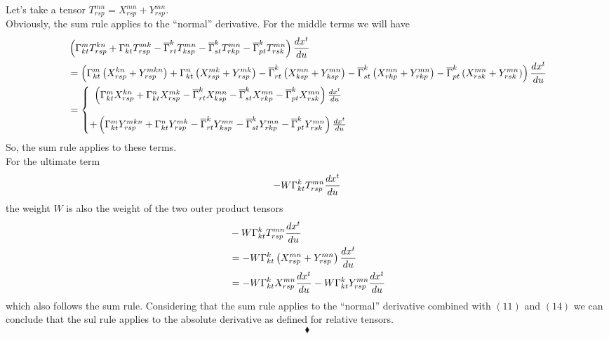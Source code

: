 Let's take a tensor $T^{mn}_{rsp} =X^{mn}_{rsp}+Y^{mn}_{rsp}$.\\
Obviously, the sum rule applies to the ``normal'' derivative.
For the middle terms we will have
\begin{align}
&\left(\Gamma^m_{kt}T^{kn}_{rsp}+\Gamma^n_{kt}T^{mk}_{rsp}-\overline{\Gamma}^k_{rt}T^{mn}_{ksp} -\overline{\Gamma}^k_{st}T^{mn}_{rkp} -\overline{\Gamma}^k_{pt}T^{mn}_{rsk} \right)\dv{x^t}{u}\\
&= \left(\Gamma^m_{kt}\left(X^{kn}_{rsp}+Y^{mkn}_{rsp}\right)+\Gamma^n_{kt}\left(X^{mk}_{rsp}+Y^{mk}_{rsp}\right)-\overline{\Gamma}^k_{rt}\left(X^{mn}_{ksp}+Y^{mn}_{ksp}\right) -\overline{\Gamma}^k_{st}\left(X^{mn}_{rkp}+Y^{mn}_{rkp}\right) -\overline{\Gamma}^k_{pt}\left(X^{mn}_{rsk}+Y^{mn}_{rsk}\right) \right)\dv{x^t}{u}\\
&= \left\{\begin{matrix}
\left(\Gamma^m_{kt}X^{kn}_{rsp}+\Gamma^n_{kt}X^{mk}_{rsp}-\overline{\Gamma}^k_{rt}X^{mn}_{ksp} -\overline{\Gamma}^k_{st}X^{mn}_{rkp} -\overline{\Gamma}^k_{pt}X^{mn}_{rsk} \right)\dv{x^t}{u}\\\\
+ \left(\Gamma^m_{kt}Y^{mkn}_{rsp}+\Gamma^n_{kt}Y^{mk}_{rsp}-\overline{\Gamma}^k_{rt}Y^{mn}_{ksp} -\overline{\Gamma}^k_{st}Y^{mn}_{rkp}-\overline{\Gamma}^k_{pt}Y^{mn}_{rsk}\right)\dv{x^t}{u}
\end{matrix}\right.
\end{align}
So, the sum rule applies to these terms.\\
For the ultimate term 
$$-W\Gamma^k_{kt}T^{mn}_{rsp}\dv{x^t}{u}$$ the weight $W$ is also the weight of the two  outer product tensors
\begin{align}
&-W\Gamma^k_{kt}T^{mn}_{rsp}\dv{x^t}{u}\\
&= 
-W\Gamma^k_{kt}\left(X^{mn}_{rsp}+Y^{mn}_{rsp}\right)\dv{x^t}{u}\\
&= 
-W\Gamma^k_{kt}X^{mn}_{rsp}\dv{x^t}{u}-W\Gamma^k_{kt}Y^{mn}_{rsp}\dv{x^t}{u}
\end{align}
which also follows the sum rule. 
Considering that the sum  rule applies to the ``normal'' derivative combined with $(11)$ and $(14)$ we can conclude that the sul rule applies to the absolute derivative as defined for relative tensors.
$$\blacklozenge$$ 
\newpage



